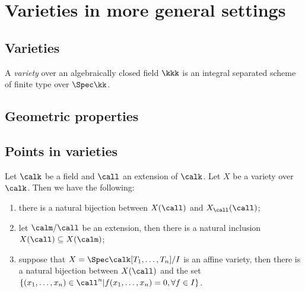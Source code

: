 \section{Varieties in more general settings}
\subsection{Varieties}

    \begin{definition}\label{def:variety_over_field}
        A \emph{variety} over an algebraically closed field \(\kkk\) is an integral separated scheme of finite type over \(\Spec \kk\).
    \end{definition}



\subsection{Geometric properties}


\subsection{Points in varieties}

    \begin{proposition}\label{prop:points_in_varieties_and_extension_of_base_field}
        Let \(\calk\) be a field and \(\call\) an extension of \(\calk\).
        Let \(X\) be a variety over \(\calk\).
        Then we have the following:
        \begin{enumerate}
            \item there is a natural bijection between \(X(\call)\) and \(X_\call(\call)\);
            \item let \(\calm/\call\) be an extension, then there is a natural inclusion \(X(\call) \subseteq X(\calm)\);
            \item suppose that \(X = \Spec \calk[T_1,\ldots,T_n]/I\) is an affine variety, then there is a natural bijection between \(X(\call)\) and the set \(\{(x_1,\ldots,x_n) \in \call^n | f(x_1,\ldots,x_n) = 0, \forall f \in I\}\).
        \end{enumerate}
    \end{proposition}